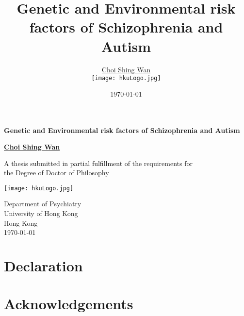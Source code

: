 \documentclass{book}
\title{Genetic and Environmental risk factors of Schizophrenia and Autism}
\date{\today}
\author{\href{mailto:choishingwan@gmail.com}{Choi Shing Wan}\\
	\texttt{[image: hkuLogo.jpg]}}
\begin{document}
\thispagestyle{empty}
\pagestyle{empty}

\begin{titlepage}
	\begin{center}
		\vspace*{1cm}
		
		\Huge
		\textbf{Genetic and Environmental risk factors of Schizophrenia and Autism}
		
		\vspace{0.5cm}
		\LARGE
		
		\vspace{1.5cm}
		
		\textbf{\href{mailto:choishingwan@gmail.com}{Choi Shing Wan}}
		
		\vfill
		
		A thesis submitted in partial fulfillment of the requirements for \\
		the Degree of Doctor of Philosophy
		
		\vspace{0.8cm}
		
		\texttt{[image: hkuLogo.jpg]}
		
		\Large
		Department of Psychiatry\\
		University of Hong Kong\\
		Hong Kong\\
		\today
		
	\end{center}
\end{titlepage}


\frontmatter 

	\cleardoublepage
	\chapter*{Declaration}
	\cleardoublepage
	\chapter*{Acknowledgements}
	\cleardoublepage
	\renewcommand{\nomname}{Abbreviations}
	\printnomenclature
	
\end{document}
